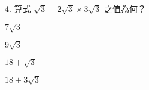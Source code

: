 \documentclass[12pt]{article}
\begin{document}
\begin{problem}
  \item[4.] 算式 $\sqrt{3} + 2\sqrt{3} \times 3\sqrt{3}$ 之值為何？
  \begin{choices}
    \item $7\sqrt{3}$
    \item $9\sqrt{3}$
    \item $18 + \sqrt{3}$
    \item $18 + 3\sqrt{3}$
  \end{choices}
\end{problem}
\end{document}
